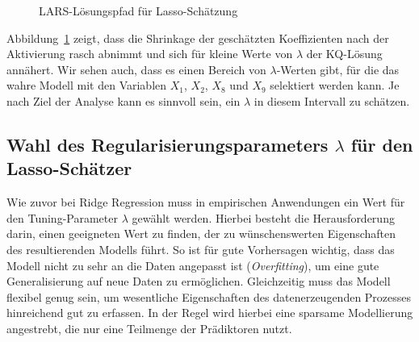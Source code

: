 \documentclass[
  a4paper,
  DIV=11,
  oneside]{scrreprt}
\begin{document}
\begin{figure}[t]


\caption{\label{fig-larssolpath}LARS-Lösungspfad für Lasso-Schätzung}

\end{figure}%

Abbildung~\ref{fig-larssolpath} zeigt, dass die Shrinkage der
geschätzten Koeffizienten nach der Aktivierung rasch abnimmt und sich
für kleine Werte von \(\lambda\) der KQ-Lösung annähert. Wir sehen auch,
dass es einen Bereich von \(\lambda\)-Werten gibt, für die das wahre
Modell mit den Variablen \(X_1\), \(X_2\), \(X_8\) und \(X_9\)
selektiert werden kann. Je nach Ziel der Analyse kann es sinnvoll sein,
ein \(\lambda\) in diesem Intervall zu schätzen.

\subsection{\texorpdfstring{Wahl des Regularisierungsparameters
\(\lambda\) für den
Lasso-Schätzer}{Wahl des Regularisierungsparameters \textbackslash lambda für den Lasso-Schätzer}}\label{wahl-des-regularisierungsparameters-lambda-fuxfcr-den-lasso-schuxe4tzer}

Wie zuvor bei Ridge Regression muss in empirischen Anwendungen ein Wert
für den Tuning-Parameter \(\lambda\) gewählt werden. Hierbei besteht die
Herausforderung darin, einen geeigneten Wert zu finden, der zu
wünschenswerten Eigenschaften des resultierenden Modells führt. So ist
für gute Vorhersagen wichtig, dass das Modell nicht zu sehr an die Daten
angepasst ist (\emph{Overfitting}), um eine gute Generalisierung auf
neue Daten zu ermöglichen. Gleichzeitig muss das Modell flexibel genug
sein, um wesentliche Eigenschaften des datenerzeugenden Prozesses
hinreichend gut zu erfassen. In der Regel wird hierbei eine sparsame
Modellierung angestrebt, die nur eine Teilmenge der Prädiktoren nutzt.
\end{document}
